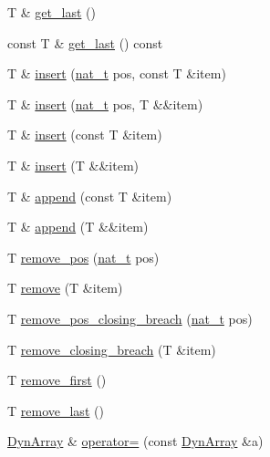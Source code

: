 \begin{DoxyCompactItemize}
\item 
T \& \hyperlink{class_designar_1_1_dyn_array_ad69873465e7540a02fceaecc4ffc9b1e}{get\+\_\+last} ()
\item 
const T \& \hyperlink{class_designar_1_1_dyn_array_a45db099e907ae4ed4398cfea487bb4d7}{get\+\_\+last} () const
\item 
T \& \hyperlink{class_designar_1_1_dyn_array_a480d65a0b64bc30d26806cdbd07e66f1}{insert} (\hyperlink{namespace_designar_aa72662848b9f4815e7bf31a7cf3e33d1}{nat\+\_\+t} pos, const T \&item)
\item 
T \& \hyperlink{class_designar_1_1_dyn_array_a919c60d5f02488027580173832af99e9}{insert} (\hyperlink{namespace_designar_aa72662848b9f4815e7bf31a7cf3e33d1}{nat\+\_\+t} pos, T \&\&item)
\item 
T \& \hyperlink{class_designar_1_1_dyn_array_a761d20ea5068101a95e77629145099fe}{insert} (const T \&item)
\item 
T \& \hyperlink{class_designar_1_1_dyn_array_a976a619d52dcc91d531e1b95609ec971}{insert} (T \&\&item)
\item 
T \& \hyperlink{class_designar_1_1_dyn_array_a7134948ab46ec703595718a7734a83c5}{append} (const T \&item)
\item 
T \& \hyperlink{class_designar_1_1_dyn_array_a0e1583bf9d554b5553438dffd57bff93}{append} (T \&\&item)
\item 
T \hyperlink{class_designar_1_1_dyn_array_a85bfa3cc9b650ae6774c17bd4a03c677}{remove\+\_\+pos} (\hyperlink{namespace_designar_aa72662848b9f4815e7bf31a7cf3e33d1}{nat\+\_\+t} pos)
\item 
T \hyperlink{class_designar_1_1_dyn_array_a989a057758da83805138d432d1d4c164}{remove} (T \&item)
\item 
T \hyperlink{class_designar_1_1_dyn_array_ac7451bfdc3b008a478fbfe03478e736d}{remove\+\_\+pos\+\_\+closing\+\_\+breach} (\hyperlink{namespace_designar_aa72662848b9f4815e7bf31a7cf3e33d1}{nat\+\_\+t} pos)
\item 
T \hyperlink{class_designar_1_1_dyn_array_a86705ec7e30d0a2f5650baf34dd702d2}{remove\+\_\+closing\+\_\+breach} (T \&item)
\item 
T \hyperlink{class_designar_1_1_dyn_array_a4dc47bbb1961b4b3d8c8938e76bb77bd}{remove\+\_\+first} ()
\item 
T \hyperlink{class_designar_1_1_dyn_array_a3e96bcac8a97cb56544d6466e834f8ac}{remove\+\_\+last} ()
\item 
\hyperlink{class_designar_1_1_dyn_array}{Dyn\+Array} \& \hyperlink{class_designar_1_1_dyn_array_a955b511053b107641f39aa2c6fb0bf05}{operator=} (const \hyperlink{class_designar_1_1_dyn_array}{Dyn\+Array} \&a)

\end{DoxyCompactItemize}
